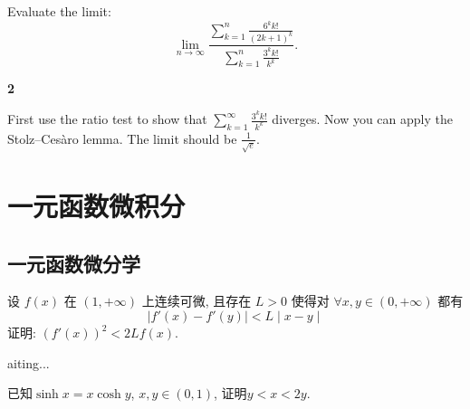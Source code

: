 \documentclass[12pt]{article}
\newenvironment{solution}[2][Solution]{\begin{trivlist}
\item[\hskip \labelsep {\bfseries #1}]}{\end{trivlist}}
\newenvironment{problem}[2][Problem]{\begin{trivlist}
\item[\hskip \labelsep {\bfseries #1}\hskip \labelsep {\bfseries #2.}]}{\end{trivlist}}
\begin{document}
\vspace{3cm}

\begin{problem}{2}
    Evaluate the limit:
    \[
        \lim_{n \to \infty} \frac{\sum_{k=1}^{n}\frac{6^k k!}{(2k+1)^k}}{\sum_{k=1}^{n} \frac{3^k k!}{k^k}}.
    \]
\end{problem}

\begin{solution}{2} \textbf{2}

    First use the ratio test to show that $\sum_{k=1}^{\infty}\frac{3^kk!}{k^k}$ diverges. Now you can apply the Stolz–Cesàro lemma. 
    The limit should be $\frac{1}{\sqrt{e}}.$
    
\end{solution}


\section{一元函数微积分}

\subsection{一元函数微分学}

\begin{problem}{1}
设 $f(x)$ 在 $(1,+\infty)$ 上连续可微, 且存在 $L>0$ 使得对 $\forall x, y \in (0, +\infty)$ 都有
\[
\mid f'(x)-f'(y) \mid < L\mid x-y\mid
\]
证明: $(f'(x))^2 < 2Lf(x)$.

\end{problem}

\begin{solution}

Waiting...
\end{solution}

\vspace{3cm}

\begin{problem}{2}
    已知$\sinh x = x\cosh y$, $x, y \in \left(0, 1\right)$, 证明$y<x<2y$.
\end{problem}
\end{document}
